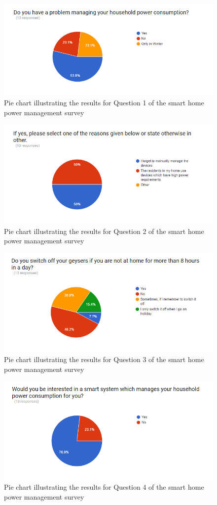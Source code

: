 \documentclass[10pt,twocolumn]{witseiepaper}
\begin{document}
	\begin{figure}[H]
\centering
\includegraphics[width=0.7\linewidth]{survey1}
\caption{Pie chart illustrating the results for Question 1 of the smart home power management survey}
\label{fig:survey1}
\end{figure}
\begin{figure}[H]
\centering
\includegraphics[width=0.7\linewidth]{survey2}
\caption{Pie chart illustrating the results for Question 2 of the smart home power management survey}
\label{fig:survey2}
\end{figure}
\begin{figure}[H]
	\centering
	\includegraphics[width=0.7\linewidth]{survey3}
	\caption{Pie chart illustrating the results for Question 3 of the smart home power management survey}
	\label{fig:survey3}
\end{figure}
\begin{figure}[H]
	\centering
	\includegraphics[width=0.7\linewidth]{survey4}
	\caption{Pie chart illustrating the results for Question 4 of the smart home power management survey}
	\label{fig:survey4}
\end{figure}
\end{document}
